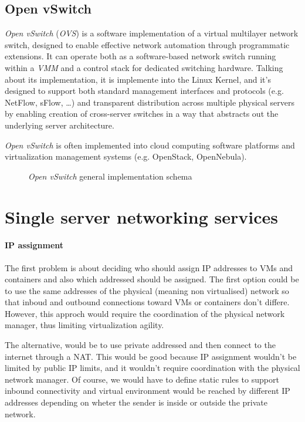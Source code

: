 \subsection{Open vSwitch}
\emph{Open vSwitch} (\emph{OVS}) is a software implementation of a virtual
multilayer network switch, designed to enable effective network automation
through programmatic extensions. It can operate both as a software-based network
switch running within a \emph{VMM} and a control stack for dedicated switching
hardware. Talking about its implementation, it is implemente into the Linux
Kernel, and it's designed to support both standard management interfaces and
protocols (e.g. NetFlow, sFlow, \dots) and transparent distribution across
multiple physical servers by enabling creation of cross-server switches in a way
that abstracts out the underlying server architecture.

\begin{note}
    \emph{Open vSwitch} is often implemented into cloud computing software
    platforms and virtualization management systems (e.g. OpenStack, OpenNebula).
\end{note}

\begin{figure}[h!]
    \centering
    \caption{\emph{Open vSwitch} general implementation schema}
\end{figure}

\section{Single server networking services}
\paragraph{IP assignment}
The first problem is about deciding who should assign IP addresses to VMs and
containers and also which addressed should be assigned. The first option could
be to use the same addresses of the physical (meaning non virtualised) network
so that inboud and outbound connections toward VMs or containers don't differe.
However, this approch would require the coordination of the physical network
manager, thus limiting virtualization agility.

The alternative, would be to use private addressed and then connect to the
internet through a NAT. This would be good because IP assignment wouldn't
be limited by public IP limits, and it wouldn't require coordination with the
physical network manager. Of course, we would have to define static rules to
support inbound connectivity and virtual environment would be reached by
different IP addresses depending on wheter the sender is inside or outside the
private network.

